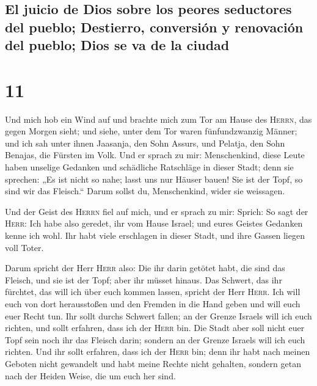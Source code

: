\hypertarget{el-juicio-de-dios-sobre-los-peores-seductores-del-pueblo-destierro-conversiuxf3n-y-renovaciuxf3n-del-pueblo-dios-se-va-de-la-ciudad}{%
\subsection{El juicio de Dios sobre los peores seductores del pueblo;
Destierro, conversión y renovación del pueblo; Dios se va de la
ciudad}\label{el-juicio-de-dios-sobre-los-peores-seductores-del-pueblo-destierro-conversiuxf3n-y-renovaciuxf3n-del-pueblo-dios-se-va-de-la-ciudad}}

\hypertarget{section-10}{%
\section{11}\label{section-10}}

 Und mich hob ein Wind auf und brachte mich zum Tor am
Hause des \textsc{Herrn}, das gegen Morgen sieht; und siehe, unter dem
Tor waren fünfundzwanzig Männer; und ich sah unter ihnen Jaasanja, den
Sohn Assurs, und Pelatja, den Sohn Benajas, die Fürsten im Volk.
 Und er sprach zu mir: Menschenkind, diese Leute haben
unselige Gedanken und schädliche Ratschläge in dieser Stadt;
 denn sie sprechen: „Es ist nicht so nahe; lasst uns nur
Häuser bauen! Sie ist der Topf, so sind wir das Fleisch.``
 Darum sollst du, Menschenkind, wider sie weissagen.

 Und der Geist des \textsc{Herrn} fiel auf mich, und er
sprach zu mir: Sprich: So sagt der \textsc{Herr}: Ich habe also geredet,
ihr vom Hause Israel; und eures Geistes Gedanken kenne ich wohl.
 Ihr habt viele erschlagen in dieser Stadt, und ihre
Gassen liegen voll Toter.

 Darum spricht der Herr \textsc{Herr} also: Die ihr darin
getötet habt, die sind das Fleisch, und sie ist der Topf; aber ihr
müsset hinaus.  Das Schwert, das ihr fürchtet, das will
ich über euch kommen lassen, spricht der Herr \textsc{Herr}.
 Ich will euch von dort herausstoßen und den Fremden in
die Hand geben und will euch euer Recht tun.  Ihr sollt
durchs Schwert fallen; an der Grenze Israels will ich euch richten, und
sollt erfahren, dass ich der \textsc{Herr} bin.  Die
Stadt aber soll nicht euer Topf sein noch ihr das Fleisch darin; sondern
an der Grenze Israels will ich euch richten.  Und ihr
sollt erfahren, dass ich der \textsc{Herr} bin; denn ihr habt nach
meinen Geboten nicht gewandelt und habt meine Rechte nicht gehalten,
sondern getan nach der Heiden Weise, die um euch her sind.

